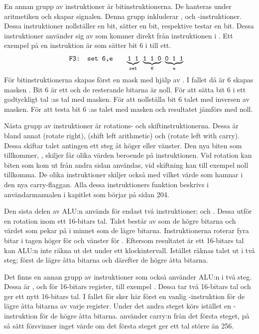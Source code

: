 \documentclass[main.tex]{subfiles}
\begin{document}
En annan grupp av instruktioner är bitinstruktionerna. De hanteras under
aritmetiken och skapar  signalen. Denna grupp inkluderar
,  och -instruktioner. Dessa instruktioner
nollställer en bit, sätter en bit, respektive testar en bit. Dessa
instruktioner använder sig av  som kommer direkt från
instruktionen i . Ett exempel på en instruktion är  som
sätter bit 6 i  till ett.
\begin{align*}
    &\texttt{F3: set 6,e}& \quad &
    {\underbrace{\texttt{1 1}}_{\texttt{set}}}\texttt{ }
    {\underbrace{\texttt{1 1 0}}_{\texttt{6}}}\texttt{ }
    {\underbrace{\texttt{0 1 1}}_{\texttt{e}}}
\end{align*}
För bitinstruktionerna skapas först en mask med hjälp av . I
fallet då  är 6 skapas masken . Bit 6 är ett
och de resterande bitarna är noll. För att sätta bit 6 i ett godtyckligt tal
:as tal med masken. För att nollställa bit 6  talet med
inversen av masken. För att testa bit 6 :as talet med masken och
resultatet jämförs med noll.

Nästa grupp av instruktioner är rotations- och skiftinstruktionerna. Dessa är
bland annat  (rotate right),  (shift left arithmetic) och
 (rotate left with carry). Dessa skiftar talet antingen ett steg åt
höger eller vänster. Den nya biten som tillkommer, , skiljer får
olika värden beroende på instruktionen. Vid rotation kan biten som kom ut från
andra sidan användas, vid skiftning kan till exempel noll tillkomma. De olika
instruktioner skiljer också med vilket värde som hamnar i den nya
carry-flaggan. Alla dessa instruktioners funktion beskrivs i
användarmanualen\cite{z80um} i kapitlet som börjar på sidan 204.

Den sista delen av ALU:n används för endast två instruktioner;  och
. Dessa utför en rotation inom ett 16-bitars tal. Talet består av
 som de högre bitarna och värdet som  pekar på i minnet som de
lägre bitarna. Instruktionerna roterar fyra bitar i tagen höger för 
och vänster för . Eftersom resultatet är ett 16-bitars tal kan ALU:n
inte räkna ut det under ett klockintervall. Istället räknas talet ut i två
steg; först de lägre åtta bitarna och därefter de högre åtta bitarna.

Det finns en annan grupp av instruktioner som också använder ALU:n i två steg.
Dessa är ,  och  för 16-bitars register, till
exempel . Dessa tar två 16-bitars tal och ger ett nytt
16-bitars tal. I fallet för  sker här först en vanlig
-instruktion för de lägre åtta bitarna av varje register. Under det
andra steget körs istället en -instruktion för de högre åtta bitarna.
 använder carry:n från det första steget, på så sätt försvinner inget
värde om det första steget ger ett tal större än 256.

\clearpage
\end{document}
